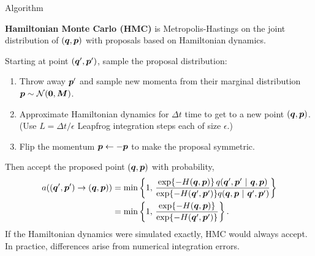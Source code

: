 \documentclass[aspectratio=169]{beamer}
\begin{document}
\begin{frame}[t,allowframebreaks]{Algorithm}\label{algorithm}

\textbf{Hamiltonian Monte Carlo (HMC)} is Metropolis-Hastings on the
joint distribution of \((\boldsymbol{q}, \boldsymbol{p})\) with proposals based on
Hamiltonian dynamics.

Starting at point \((\boldsymbol{q}', \boldsymbol{p}')\), sample the proposal distribution:

\begin{enumerate}
\def\labelenumi{\arabic{enumi}.}
\item
  Throw away \(\boldsymbol{p}'\) and sample new momenta from their marginal
  distribution \(\boldsymbol{p} \sim \mathcal{N}(\boldsymbol{0}, \boldsymbol{M})\).
\item
  Approximate Hamiltonian dynamics for \(\Delta t\) time to get to a new
  point \((\boldsymbol{q}, \boldsymbol{p})\). (Use \(L = \Delta t/\epsilon\) Leapfrog
  integration steps each of size \(\epsilon\).)
\item
  Flip the momentum \(\boldsymbol{p} \leftarrow -\boldsymbol{p}\) to make the proposal
  symmetric.
\end{enumerate}

Then accept the proposed point \((\boldsymbol{q}, \boldsymbol{p})\) with probability,
\begin{align*}
    a((\boldsymbol{q}', \boldsymbol{p}') \to (\boldsymbol{q}, \boldsymbol{p})) &= 
    \min \left\{1, \, \frac{\exp\{-H(\boldsymbol{q}, \boldsymbol{p})\} \, q(\boldsymbol{q}', \boldsymbol{p}' ~\vert~ \boldsymbol{q}, \boldsymbol{p})}{\exp\{-H(\boldsymbol{q}', \boldsymbol{p}')\} q(\boldsymbol{q}, \boldsymbol{p} ~\vert~ \boldsymbol{q}', \boldsymbol{p}')} \right \} \\
    &=
    \min \left\{1, \, \frac{\exp\{-H(\boldsymbol{q}, \boldsymbol{p})\}}{\exp \{-H(\boldsymbol{q}', \boldsymbol{p}')\}} \right \}.
\end{align*} If the Hamiltonian dynamics were simulated exactly, HMC
would always accept. In practice, differences arise from numerical
integration errors.
\end{frame}
\end{document}
